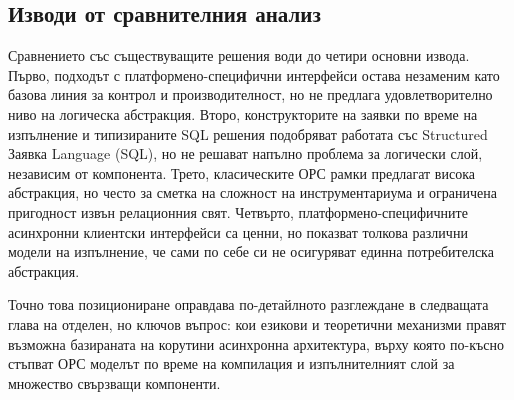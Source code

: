 \subsection{Изводи от сравнителния анализ}

Сравнението със съществуващите решения води до четири основни извода. Първо, подходът с платформено-специфични интерфейси остава незаменим като базова линия за контрол и производителност, но не предлага удовлетворително ниво на логическа абстракция. Второ, конструкторите на заявки по време на изпълнение и типизираните SQL решения подобряват работата със Structured Заявка Language (SQL), но не решават напълно проблема за логически слой, независим от компонента. Трето, класическите ОРС рамки предлагат висока абстракция, но често за сметка на сложност на инструментариума и ограничена пригодност извън релационния свят. Четвърто, платформено-специфичните асинхронни клиентски интерфейси са ценни, но показват толкова различни модели на изпълнение, че сами по себе си не осигуряват единна потребителска абстракция.

Точно това позициониране оправдава по-детайлното разглеждане в следващата глава на отделен, но ключов въпрос: кои езикови и теоретични механизми правят възможна базираната на корутини асинхронна архитектура, върху която по-късно стъпват ОРС моделът по време на компилация и изпълнителният слой за множество свързващи компоненти.
